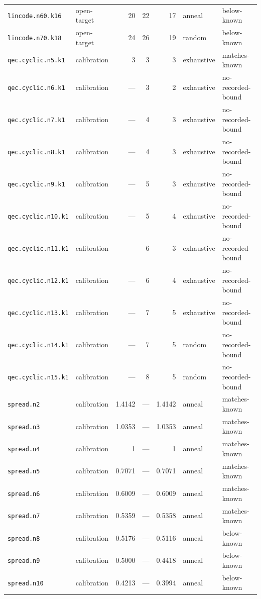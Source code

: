 \begin{longtable}{llrrrll}
\texttt{lincode.n60.k16} & open-target & 20 & 22 & 17 & anneal & below-known\\
\texttt{lincode.n70.k18} & open-target & 24 & 26 & 19 & random & below-known\\
\texttt{qec.cyclic.n5.k1} & calibration & 3 & 3 & 3 & exhaustive & matches-known\\
\texttt{qec.cyclic.n6.k1} & calibration & — & 3 & 2 & exhaustive & no-recorded-bound\\
\texttt{qec.cyclic.n7.k1} & calibration & — & 4 & 3 & exhaustive & no-recorded-bound\\
\texttt{qec.cyclic.n8.k1} & calibration & — & 4 & 3 & exhaustive & no-recorded-bound\\
\texttt{qec.cyclic.n9.k1} & calibration & — & 5 & 3 & exhaustive & no-recorded-bound\\
\texttt{qec.cyclic.n10.k1} & calibration & — & 5 & 4 & exhaustive & no-recorded-bound\\
\texttt{qec.cyclic.n11.k1} & calibration & — & 6 & 3 & exhaustive & no-recorded-bound\\
\texttt{qec.cyclic.n12.k1} & calibration & — & 6 & 4 & exhaustive & no-recorded-bound\\
\texttt{qec.cyclic.n13.k1} & calibration & — & 7 & 5 & exhaustive & no-recorded-bound\\
\texttt{qec.cyclic.n14.k1} & calibration & — & 7 & 5 & random & no-recorded-bound\\
\texttt{qec.cyclic.n15.k1} & calibration & — & 8 & 5 & random & no-recorded-bound\\
\texttt{spread.n2} & calibration & 1.4142 & — & 1.4142 & anneal & matches-known\\
\texttt{spread.n3} & calibration & 1.0353 & — & 1.0353 & anneal & matches-known\\
\texttt{spread.n4} & calibration & 1 & — & 1 & anneal & matches-known\\
\texttt{spread.n5} & calibration & 0.7071 & — & 0.7071 & anneal & matches-known\\
\texttt{spread.n6} & calibration & 0.6009 & — & 0.6009 & anneal & matches-known\\
\texttt{spread.n7} & calibration & 0.5359 & — & 0.5358 & anneal & matches-known\\
\texttt{spread.n8} & calibration & 0.5176 & — & 0.5116 & anneal & below-known\\
\texttt{spread.n9} & calibration & 0.5000 & — & 0.4418 & anneal & below-known\\
\texttt{spread.n10} & calibration & 0.4213 & — & 0.3994 & anneal & below-known\\
\bottomrule
\end{longtable}
